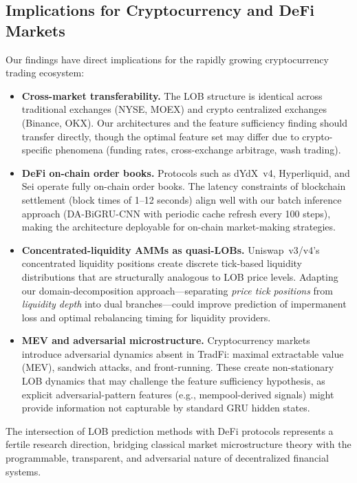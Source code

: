 \documentclass[11pt,a4paper]{article}
\newcommand{\methodname}{DA-BiGRU-CNN}
\begin{document}
\subsection{Implications for Cryptocurrency and DeFi Markets}

Our findings have direct implications for the rapidly growing cryptocurrency trading ecosystem:

\begin{itemize}[itemsep=0.2em]
    \item \textbf{Cross-market transferability.} The LOB structure is identical across traditional exchanges (NYSE, MOEX) and crypto centralized exchanges (Binance, OKX). Our architectures and the feature sufficiency finding should transfer directly, though the optimal feature set may differ due to crypto-specific phenomena (funding rates, cross-exchange arbitrage, wash trading).

    \item \textbf{DeFi on-chain order books.} Protocols such as dYdX~v4, Hyperliquid, and Sei operate fully on-chain order books. The latency constraints of blockchain settlement (block times of 1--12 seconds) align well with our batch inference approach (\methodname{} with periodic cache refresh every 100 steps), making the architecture deployable for on-chain market-making strategies.

    \item \textbf{Concentrated-liquidity AMMs as quasi-LOBs.} Uniswap~v3/v4's concentrated liquidity positions create discrete tick-based liquidity distributions that are structurally analogous to LOB price levels. Adapting our domain-decomposition approach---separating \emph{price tick positions} from \emph{liquidity depth} into dual branches---could improve prediction of impermanent loss and optimal rebalancing timing for liquidity providers.

    \item \textbf{MEV and adversarial microstructure.} Cryptocurrency markets introduce adversarial dynamics absent in TradFi: maximal extractable value (MEV), sandwich attacks, and front-running. These create non-stationary LOB dynamics that may challenge the feature sufficiency hypothesis, as explicit adversarial-pattern features (e.g., mempool-derived signals) might provide information not capturable by standard GRU hidden states.
\end{itemize}

The intersection of LOB prediction methods with DeFi protocols represents a fertile research direction, bridging classical market microstructure theory with the programmable, transparent, and adversarial nature of decentralized financial systems.
\end{document}

